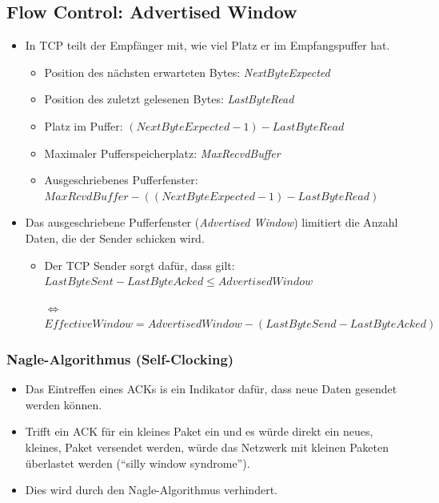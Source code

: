 \documentclass[a4paper, 11pt, accentcolor = tud3b]{tudreport}
\begin{document}
            \subsection{Flow Control: Advertised Window}
                \begin{itemize}
                	\item In TCP teilt der Empfänger mit, wie viel Platz er im Empfangspuffer hat.
	                	\begin{itemize}
	                		\item Position des nächsten erwarteten Bytes: \textit{NextByteExpected}
	                		\item Position des zuletzt gelesenen Bytes: \textit{LastByteRead}
	                		\item Platz im Puffer: \( (\textit{NextByteExpected} - 1) - \textit{LastByteRead} \)
	                		\item Maximaler Pufferspeicherplatz: \textit{MaxRecvdBuffer}
	                		\item Ausgeschriebenes Pufferfenster: \( \textit{MaxRcvdBuffer} - ((NextByteExpected - 1) - LastByteRead) \)
	                	\end{itemize}
	                \item Das ausgeschriebene Pufferfenster (\textit{Advertised Window}) limitiert die Anzahl Daten, die der Sender schicken wird.
		                \begin{itemize}
		                	\item Der TCP Sender sorgt dafür, dass gilt: \( \textit{LastByteSent} - \textit{LastByteAcked} \leq \textit{AdvertisedWindow} \)
		                	\item[\(\iff\)] \( \textit{EffectiveWindow} = \textit{AdvertisedWindow} - (\textit{LastByteSend} - \textit{LastByteAcked}) \)
		                \end{itemize}
                \end{itemize}
                
                \subsubsection{Nagle-Algorithmus (Self-Clocking)}
	                \begin{itemize}
	                	\item Das Eintreffen eines ACKs is ein Indikator dafür, dass neue Daten gesendet werden können.
	                	\item Trifft ein ACK für ein kleines Paket ein und es würde direkt ein neues, kleines, Paket versendet werden, würde das Netzwerk mit kleinen Paketen überlastet werden (\enquote{silly window syndrome}).
	                	\item Dies wird durch den Nagle-Algorithmus verhindert.
	                \end{itemize}
	                
\end{document}

